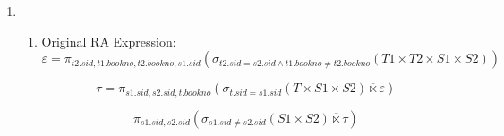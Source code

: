 \documentclass{article}
\begin{document}
\begin{enumerate}
\begin{enumerate}
\begin{enumerate}
    \end{enumerate}

    \item %
    \begin{enumerate}
        \item Original RA Expression: %
        \begin{displaymath}
            \varepsilon = \pi_{t2.sid, t1.bookno, t2.bookno, s1.sid}(\sigma_{t2.sid=s2.sid \wedge t1.bookno \ne t2.bookno}(T1 \times T2 \times S1 \times S2))
        \end{displaymath}

        \begin{displaymath}
            \tau = \pi_{s1.sid, s2.sid, t.bookno}(\sigma_{t.sid=s1.sid}(T \times S1 \times S2) \overline{\ltimes} \varepsilon)
        \end{displaymath}

        \begin{displaymath}
            \pi_{s1.sid, s2.sid}(\sigma_{s1.sid \ne s2.sid}(S1 \times S2) \overline{\ltimes} \tau)
        \end{displaymath}
    \end{enumerate}

\end{enumerate}
\end{enumerate}
\end{document}
